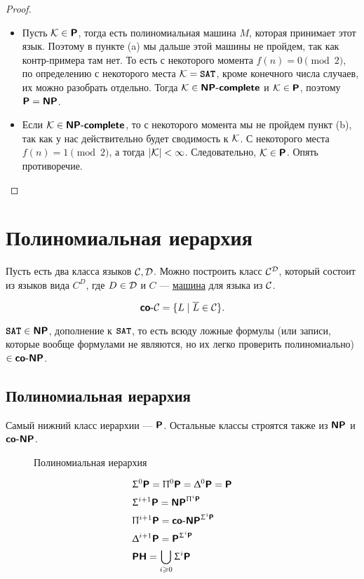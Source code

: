 \begin{proof}
	\begin{itemize}
		\item
	Пусть $ \K \in \P$, тогда  есть полиномиальная машина $ M$, которая принимает этот язык. Поэтому в пункте (a) мы дальше этой машины не пройдем, так как  контр-примера там нет. То есть с некоторого момента $ f(n) = 0 \pmod 2$, по определению с некоторого места   $ \K = \SAT$, кроме конечного числа случаев, их можно разобрать отдельно. 
	Тогда $ \K \in \NPcomp $ и $ \K \in \P$, поэтому $ \P = \NP$.
\item Если $ \K \in \NPcomp$, то с некоторого момента мы не пройдем пункт (b), так как у нас действительно будет сводимость к $ \K$.
	С некоторого места  $ f(n) = 1 \pmod 2$, а тогда  $ \lvert \K \rvert < \infty$. Следовательно, $ \K \in \P$. Опять противоречие. 
	\end{itemize}
\end{proof}

\section{Полиномиальная иерархия}
\begin{name}
Пусть есть два класса языков $ \Cclass, \Dclass$. Можно построить класс $ \Cclass ^{\Dclass}$, который состоит из  языков вида $ C^{D} $, где $ D \in \Dclass$ и $ C$ --- \underline{машина} для языка из $ \Cclass$.
\end{name}
\begin{defn}
    \[
    \coC = \{L \mid \overline{L} \in \Cclass\}
    .\] 
\end{defn}
\begin{ex}
	$ \SAT \in \NP$, дополнение к $ \SAT$, то есть всюду ложные формулы (или записи, которые вообще формулами не являются, но их легко проверить полиномиально) $ \in \coNP$.
\end{ex}

\subsection{Полиномиальная иерархия}
Самый нижний класс иерархии --- $ \P$. Остальные классы строятся также из  $ \NP$ и $ \coNP$.
\begin{figure}[b!]
    \centering
    \caption{Полиномиальная иерархия}
    \label{fig:hierarchy}
\end{figure}
\[
\begin{aligned}
	&\SIGMA ^{0}\P = \PI ^{0}\P = \DELTA ^{0} \P = \P \\
	& \SIGMA ^{i+1} \P = \NP^{\PI^{i}\P} \\
	& \PI^{i+1}\P = \coNP^{\SIGMA ^{i}\P}\\
	& \DELTA ^{i+1}\P = \P^{\SIGMA ^{i}\P} \\
	& \PH = \bigcup_{i \ge 0} \SIGMA ^{i} \P
\end{aligned}\index{\PH}\index{$\SIGMA^{i}\P$}\index{$\PI^i\P$ }\index{$\Delta ^{i}\P$}
\]

